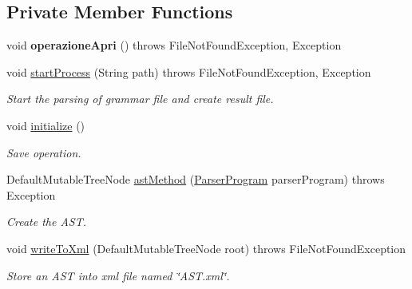 \subsection*{Private Member Functions}
\begin{DoxyCompactItemize}
\item 
\hypertarget{class_home_gui_a8a91bfb188035012962b468a651f73a5}{void {\bfseries operazione\-Apri} ()  throws File\-Not\-Found\-Exception, Exception }\label{class_home_gui_a8a91bfb188035012962b468a651f73a5}

\item 
void \hyperlink{class_home_gui_a52f0602a97cd1ef63063bbbbda036d26}{start\-Process} (String path)  throws File\-Not\-Found\-Exception, Exception 
\begin{DoxyCompactList}\small\item\em Start the parsing of grammar file and create result file. \end{DoxyCompactList}\item 
void \hyperlink{class_home_gui_a5e935834d62fe14dfda2c9884f1f7010}{initialize} ()
\begin{DoxyCompactList}\small\item\em Save operation. \end{DoxyCompactList}\item 
Default\-Mutable\-Tree\-Node \hyperlink{class_home_gui_ac44ac869c6c437c200139d79f9f9b027}{ast\-Method} (\hyperlink{classparser_program_1_1_parser_program}{Parser\-Program} parser\-Program)  throws Exception 
\begin{DoxyCompactList}\small\item\em Create the A\-S\-T. \end{DoxyCompactList}\item 
void \hyperlink{class_home_gui_a0428d3c56abfafc769684835c1581f38}{write\-To\-Xml} (Default\-Mutable\-Tree\-Node root)  throws File\-Not\-Found\-Exception 
\begin{DoxyCompactList}\small\item\em Store an A\-S\-T into xml file named \char`\"{}\-A\-S\-T.\-xml\char`\"{}. \end{DoxyCompactList}\end{DoxyCompactItemize}

